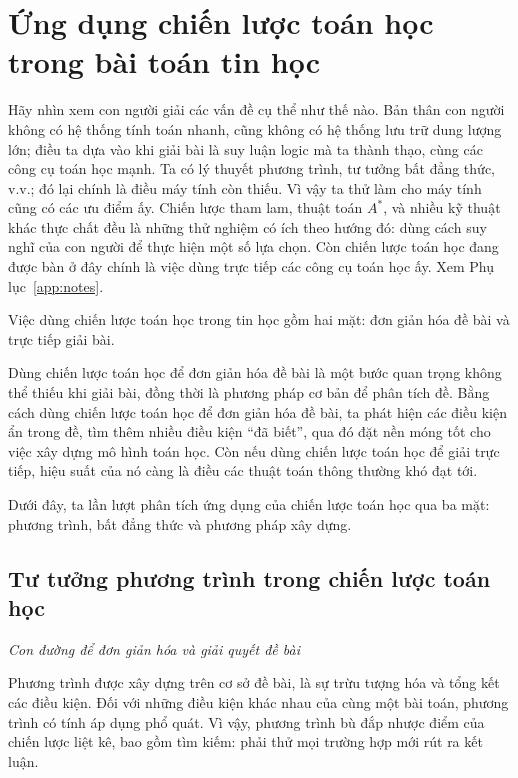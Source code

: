 \documentclass[11pt]{article}
\begin{document}
\section{Ứng dụng chiến lược toán học trong bài toán tin học}

Hãy nhìn xem con người giải các vấn đề cụ thể như thế nào. Bản thân con người
không có hệ thống tính toán nhanh, cũng không có hệ thống lưu trữ dung lượng
lớn; điều ta dựa vào khi giải bài là suy luận logic mà ta thành thạo, cùng
các công cụ toán học mạnh. Ta có lý thuyết phương trình, tư tưởng bất đẳng
thức, v.v.; đó lại chính là điều máy tính còn thiếu. Vì vậy ta thử làm cho
máy tính cũng có các ưu điểm ấy. Chiến lược tham lam, thuật toán \(A^*\), và
nhiều kỹ thuật khác thực chất đều là những thử nghiệm có ích theo hướng đó:
dùng cách suy nghĩ của con người để thực hiện một số lựa chọn. Còn chiến lược
toán học đang được bàn ở đây chính là việc dùng trực tiếp các công cụ toán
học ấy. Xem Phụ lục~\ref{app:notes}.

Việc dùng chiến lược toán học trong tin học gồm hai mặt: đơn giản hóa đề bài
và trực tiếp giải bài.

Dùng chiến lược toán học để đơn giản hóa đề bài là một bước quan trọng không
thể thiếu khi giải bài, đồng thời là phương pháp cơ bản để phân tích đề. Bằng
cách dùng chiến lược toán học để đơn giản hóa đề bài, ta phát hiện các điều
kiện ẩn trong đề, tìm thêm nhiều điều kiện ``đã biết'', qua đó đặt nền móng
tốt cho việc xây dựng mô hình toán học. Còn nếu dùng chiến lược toán học để
giải trực tiếp, hiệu suất của nó càng là điều các thuật toán thông thường
khó đạt tới.

Dưới đây, ta lần lượt phân tích ứng dụng của chiến lược toán học qua ba mặt:
phương trình, bất đẳng thức và phương pháp xây dựng.

\subsection{Tư tưởng phương trình trong chiến lược toán học}

\begin{center}
\textit{Con đường để đơn giản hóa và giải quyết đề bài}
\end{center}

Phương trình được xây dựng trên cơ sở đề bài, là sự trừu tượng hóa và tổng
kết các điều kiện. Đối với những điều kiện khác nhau của cùng một bài toán,
phương trình có tính áp dụng phổ quát. Vì vậy, phương trình bù đắp nhược điểm
của chiến lược liệt kê, bao gồm tìm kiếm: phải thử mọi trường hợp mới rút ra
kết luận.
\end{document}
